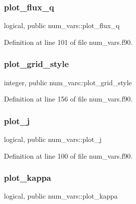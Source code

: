 \subsubsection{\texorpdfstring{plot\+\_\+flux\+\_\+q}{plot\_flux\_q}}
{\footnotesize\ttfamily logical, public num\+\_\+vars\+::plot\+\_\+flux\+\_\+q}



Definition at line 101 of file num\+\_\+vars.\+f90.

\mbox{\label{namespacenum__vars_a0e40187c6517fb55cc756c5656327fb9}} 
\subsubsection{\texorpdfstring{plot\+\_\+grid\+\_\+style}{plot\_grid\_style}}
{\footnotesize\ttfamily integer, public num\+\_\+vars\+::plot\+\_\+grid\+\_\+style}



Definition at line 156 of file num\+\_\+vars.\+f90.

\mbox{\label{namespacenum__vars_aa5519c9217b33a3a677e058723638fa9}} 
\subsubsection{\texorpdfstring{plot\+\_\+j}{plot\_j}}
{\footnotesize\ttfamily logical, public num\+\_\+vars\+::plot\+\_\+j}



Definition at line 100 of file num\+\_\+vars.\+f90.

\mbox{\label{namespacenum__vars_a15a00106d8f59e98ab924f905cf2ddac}} 
\subsubsection{\texorpdfstring{plot\+\_\+kappa}{plot\_kappa}}
{\footnotesize\ttfamily logical, public num\+\_\+vars\+::plot\+\_\+kappa}



